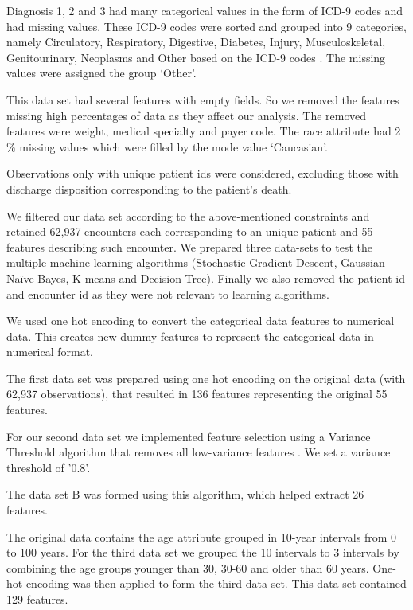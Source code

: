 \documentclass[9pt,twocolumn,twoside]{styles/osajnl}
\begin{document}
Diagnosis 1, 2 and 3 had many categorical values in the form of ICD-9 codes and had missing values. These ICD-9 codes were sorted and grouped into 9 categories, namely Circulatory, Respiratory, Digestive, Diabetes, Injury, Musculoskeletal, Genitourinary, Neoplasms and Other based on the ICD-9 codes \cite{article-hindawi}. The missing values were assigned the group ‘Other’.

This data set had several  features with empty fields. So we removed the features missing high percentages of data as they affect our analysis. The removed  features were weight, medical specialty and payer code. The race attribute had 2$\%$ missing values which were filled by the mode value ‘Caucasian’.

Observations only with unique patient ids were considered, excluding those with discharge disposition corresponding to the patient’s death.

We filtered our data set according to the above-mentioned constraints and retained  62,937 encounters each corresponding to an unique patient and 55 features describing such encounter. We prepared three data-sets to test the multiple machine learning algorithms (Stochastic Gradient Descent, Gaussian Naïve Bayes, K-means and Decision Tree).  Finally we also removed the patient id and encounter id  as they were not relevant to learning algorithms.

We used one hot encoding to convert the categorical data features  to numerical data. This creates new dummy features to represent the categorical data in numerical format.

The first data set was prepared using one hot encoding on the original data (with 62,937 observations), that resulted in 136 features representing the original 55 features.

For our second data set we implemented feature selection using a Variance Threshold algorithm that removes all low-variance features \cite{www-vt}. We set a variance threshold of '0.8'.

The data set B was formed using this algorithm, which helped extract 26 features.

The original data contains the age attribute grouped in 10-year intervals from 0 to 100 years. For the third data set we grouped the 10 intervals to 3 intervals by combining the age groups younger than 30, 30-60 and older than 60 years. One-hot encoding was then applied to form the third data set. This data set contained 129 features.
\end{document}
